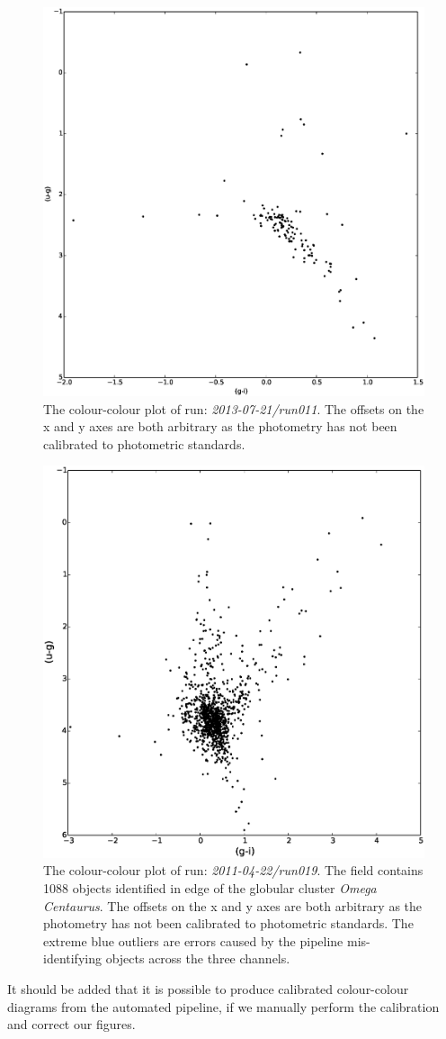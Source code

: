 \begin{figure}
\centering
\includegraphics[width=120mm]{images/2013-07-21-run011-2colour.eps}
\caption{The colour-colour plot of run: \emph{2013-07-21/run011}. The offsets on the x and y axes are both arbitrary as the photometry has not been calibrated to photometric standards.}
\label{fig:differentialtrad}
\end{figure}


\begin{figure}
\centering
\includegraphics[width=120mm]{images//2011-04-22-run019-omegacen-2colour.eps}
\caption{The colour-colour plot of run: \emph{2011-04-22/run019}. The field contains 1088 objects identified in edge of the globular cluster \emph{Omega Centaurus}. The offsets on the x and y axes are both arbitrary as the photometry has not been calibrated to photometric standards. The extreme blue outliers are errors caused by the pipeline mis-identifying objects across the three channels.}
\label{fig:differentialtrad}
\end{figure}

It should be added that it is possible to produce calibrated colour-colour diagrams from the automated pipeline, if we manually perform the calibration and correct our figures. 
